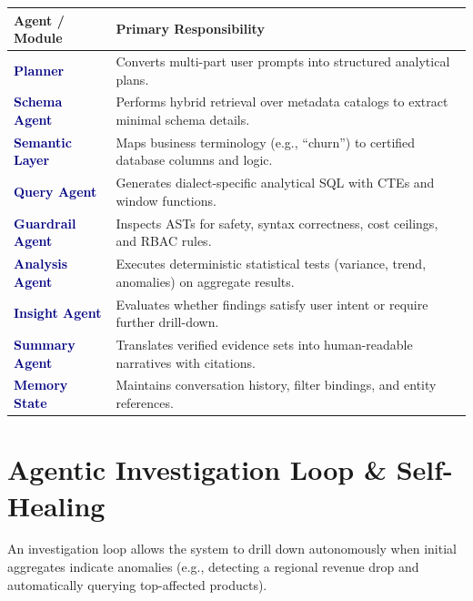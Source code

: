 \documentclass[11pt,a4paper]{article}
\newcommand{\agent}[1]{\textbf{\textcolor{navy}{#1}}}
\begin{document}
\begin{longtable}{p{} p{}}
\toprule
\textbf{Agent / Module} & \textbf{Primary Responsibility}\\
\midrule
\agent{Planner} & Converts multi-part user prompts into structured analytical plans.\\
\agent{Schema Agent} & Performs hybrid retrieval over metadata catalogs to extract minimal schema details.\\
\agent{Semantic Layer} & Maps business terminology (e.g., ``churn'') to certified database columns and logic.\\
\agent{Query Agent} & Generates dialect-specific analytical SQL with CTEs and window functions.\\
\agent{Guardrail Agent} & Inspects ASTs for safety, syntax correctness, cost ceilings, and RBAC rules.\\
\agent{Analysis Agent} & Executes deterministic statistical tests (variance, trend, anomalies) on aggregate results.\\
\agent{Insight Agent} & Evaluates whether findings satisfy user intent or require further drill-down.\\
\agent{Summary Agent} & Translates verified evidence sets into human-readable narratives with citations.\\
\agent{Memory State} & Maintains conversation history, filter bindings, and entity references.\\
\bottomrule
\end{longtable}

\section{Agentic Investigation Loop \& Self-Healing}

An investigation loop allows the system to drill down autonomously when initial aggregates indicate anomalies (e.g., detecting a regional revenue drop and automatically querying top-affected products).
\end{document}

